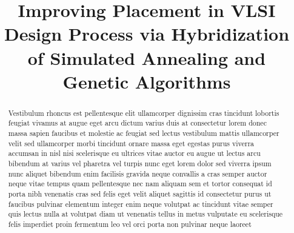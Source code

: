 \documentclass[conference]{IEEEtran}
\begin{document}

\title{Improving Placement in VLSI Design Process via Hybridization of Simulated Annealing and Genetic Algorithms \\}


\author{
}


\maketitle


\begin{abstract}

Vestibulum rhoncus est pellentesque elit ullamcorper dignissim cras tincidunt lobortis feugiat vivamus at augue eget arcu dictum varius duis at consectetur lorem donec massa sapien faucibus et molestie ac feugiat sed lectus vestibulum mattis ullamcorper velit sed ullamcorper morbi tincidunt ornare massa eget egestas purus viverra accumsan in nisl nisi scelerisque eu ultrices vitae auctor eu augue ut lectus arcu bibendum at varius vel pharetra vel turpis nunc eget lorem dolor sed viverra ipsum nunc aliquet bibendum enim facilisis gravida neque convallis a cras semper auctor neque vitae tempus quam pellentesque nec nam aliquam sem et tortor consequat id porta nibh venenatis cras sed felis eget velit aliquet sagittis id consectetur purus ut faucibus pulvinar elementum integer enim neque volutpat ac tincidunt vitae semper quis lectus nulla at volutpat diam ut venenatis tellus in metus vulputate eu scelerisque felis imperdiet proin fermentum leo vel orci porta non pulvinar neque laoreet

\end{abstract}
\end{document}
